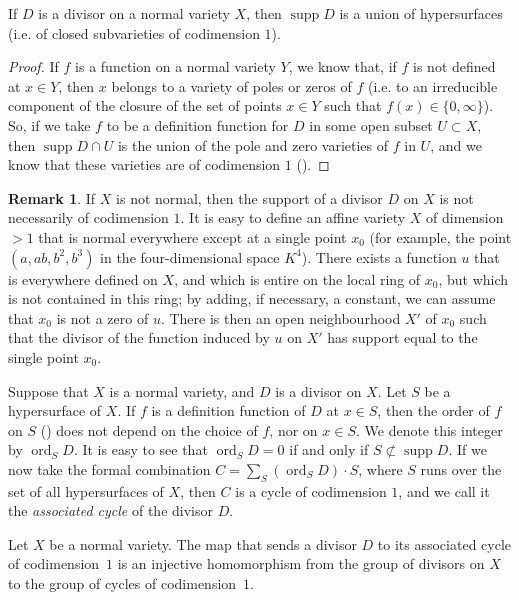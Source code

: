 \documentclass{article}
\theoremstyle{plain}
\newenvironment{proposition}[1]
    {\renewcommand\theinnercustomproposition{#1}\innercustomproposition}
    {\endinnercustomproposition}
\theoremstyle{definition}
\newtheorem*{remark}{Remark}
\DeclareMathOperator{\supp}{supp}
\DeclareMathOperator{\ord}{ord}
\newcommand{\oldpage}[1]{\marginpar{\footnotesize$\Big\vert$ \textit{p.~#1}}}
\begin{document}
\oldpage{4-08}
\begin{proposition}{8}
\label{proposition8}
  If $D$ is a divisor on a normal variety $X$, then $\supp D$ is a union of hypersurfaces (i.e. of closed subvarieties of codimension $1$).
\end{proposition}

\begin{proof}
  If $f$ is a function on a normal variety $Y$, we know that, if $f$ is not defined at $x\in Y$, then $x$ belongs to a variety of poles or zeros of $f$ (i.e. to an irreducible component of the closure of the set of points $x\in Y$ such that $f(x)\in\{0,\infty\}$).
  So, if we take $f$ to be a definition function for $D$ in some open subset $U\subset X$, then $\supp D\cap U$ is the union of the pole and zero varieties of $f$ in $U$, and we know that these varieties are of codimension $1$ (\cite[chapitre~III]{2}).
\end{proof}

\begin{remark}
  If $X$ is not normal, then the support of a divisor $D$ on $X$ is not necessarily of codimension $1$.
  It is easy to define an affine variety $X$ of dimension $>1$ that is normal everywhere except at a single point $x_0$ (for example, the point $(a,ab,b^2,b^3)$ in the four-dimensional space $K^4$).
  There exists a function $u$ that is everywhere defined on $X$, and which is entire on the local ring of $x_0$, but which is not contained in this ring;
  by adding, if necessary, a constant, we can assume that $x_0$ is not a zero of $u$.
  There is then an open neighbourhood $X'$ of $x_0$ such that the divisor of the function induced by $u$ on $X'$ has support equal to the single point $x_0$.
\end{remark}

Suppose that $X$ is a normal variety, and $D$ is a divisor on $X$.
Let $S$ be a hypersurface of $X$.
If $f$ is a definition function of $D$ at $x\in S$, then the order of $f$ on $S$ (\cite{2}) does not depend on the choice of $f$, nor on $x\in S$.
We denote this integer by $\ord_S D$.
It is easy to see that $\ord_S D=0$ if and only if $S\not\subset\supp D$.
If we now take the formal combination $C=\sum_S(\ord_S D)\cdot S$, where $S$ runs over the set of all hypersurfaces of $X$, then $C$ is a cycle of codimension $1$, and we call it the \emph{associated cycle} of the divisor $D$.

\begin{proposition}{9}
\label{proposition9}
  Let $X$ be a normal variety.
  The map that sends a divisor $D$ to its associated cycle of codimension~$1$ is an injective homomorphism from the group of divisors on $X$ to the group of cycles of codimension~$1$.
\end{proposition}
\end{document}
